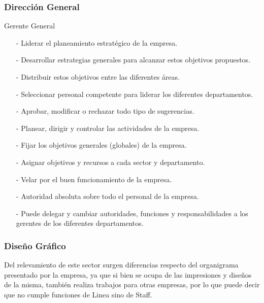 \documentclass[a4paper,10pt,titlepage]{article}
\begin{document}
\subsubsection{Direcci\'on General}

{
    Gerente General
}
{
 \begin{itemize}
    \item[-] Liderar el planeamiento estrat\'egico de la empresa.
    \item[-] Desarrollar estrategias generales para alcanzar estos objetivos propuestos.
    \item[-] Distribuir estos objetivos entre las diferentes \'areas.
    \item[-] Seleccionar personal competente para liderar los diferentes departamentos.
    \item[-] Aprobar, modificar o rechazar todo tipo de sugerencias.
 \end{itemize}
}
{
 \begin{itemize}
    \item[-] Planear, dirigir y controlar las actividades de la empresa.
    \item[-] Fijar los objetivos generales (globales) de la empresa.
    \item[-] Asignar objetivos y recursos a cada sector y departamento.
    \item[-] Velar por el buen funcionamiento de la empresa.
 \end{itemize}
}
{ 
 \begin{itemize}
    \item[-] Autoridad absoluta sobre todo el personal de la empresa.
    \item[-] Puede delegar y cambiar autoridades, funciones y responsabilidades a los gerentes de los diferentes departamentos.
 \end{itemize}
}


\newpage

\subsubsection{Dise\~no Gr\'afico}
\smallskip
Del relevamiento de este sector surgen diferencias respecto del organigrama presentado por la empresa, ya que si bien se ocupa de las impresiones y dise\~nos de la misma, 
tambi\'en realiza trabajos para otras empresas, por lo que puede decir que no cumple funciones de Linea sino de Staff.
\smallskip
\end{document}
